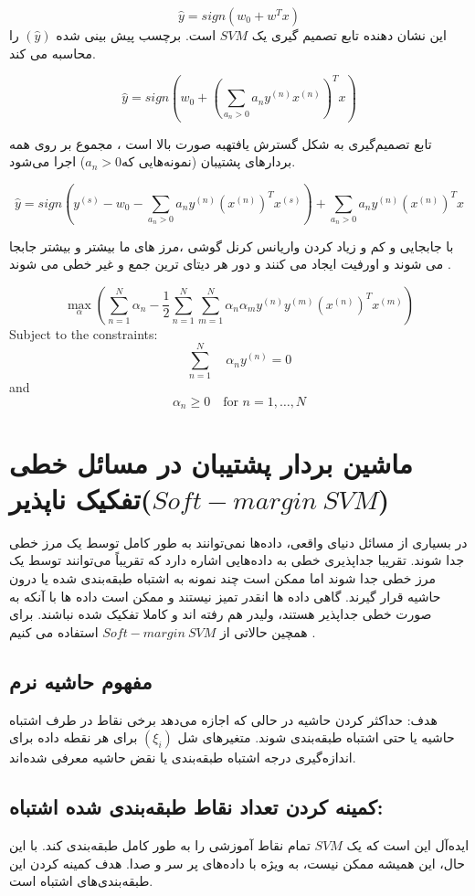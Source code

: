 \documentclass[12pt]{article}
\begin{document}
$$ \hat{y} = sign(w_0 + w^T x) $$
این نشان دهنده تابع تصمیم گیری یک 
$SVM$
است. برچسب پیش بینی شده 
$(\hat{y})$
را محاسبه می کند.

$$ \hat{y} = sign\left(w_0 + \left(\sum_{a_n > 0} a_n y^{(n)} x^{(n)}\right)^T x\right) $$


تابع تصمیم‌گیری به شکل گسترش یافتهبه صورت بالا است ،  مجموع بر روی همه بردارهای پشتیبان (نمونه‌هایی که$a_n > 0$) اجرا می‌شود.


$$ \hat{y} = sign\left(y^{(s)} - w_0 -\sum_{a_n > 0} a_n y^{(n)} (x^{(n)})^T x^{(s)}\right) +\sum_{a_n > 0} a_n y^{(n)} (x^{(n)})^T x $$



با جابجایی و کم و زیاد کردن واریانس کرنل گوشی ،مرز های ما بیشتر و بیشتر جابجا می شوند و اورفیت ایجاد می کنند  و دور هر دیتای ترین جمع و غیر خطی می شوند .

\begin{latin}
    $$
\max_{\alpha} \left( \sum_{n=1}^{N} \alpha_n - \frac{1}{2} \sum_{n=1}^{N} \sum_{m=1}^{N} \alpha_n \alpha_m y^{(n)} y^{(m)} \left( x^{(n)} \right)^T x^{(m)} \right)
$$
Subject to the constraints:
$$
\sum_{n=1}^{N} \quad \alpha_n y^{(n)} = 0
$$
and
$$
\alpha_n \geq 0 \quad \text{for } n = 1, \ldots, N
$$
\end{latin}

\section{ماشین بردار پشتیبان در مسائل خطی تفکیک ناپذیر($Soft-margin\:SVM$)
}
در بسیاری از مسائل دنیای واقعی، داده‌ها نمی‌توانند به طور کامل توسط یک مرز خطی جدا شوند. تقریبا جداپذیری خطی به داده‌هایی اشاره دارد که تقریباً می‌توانند توسط یک مرز خطی جدا شوند اما ممکن است چند نمونه به اشتباه طبقه‌بندی شده یا درون حاشیه قرار گیرند.
گاهی داده ها انقدر تمیز نیستند و ممکن است داده ها با آنکه به صورت خطی جداپذیر هستند، ولیدر هم رفته اند و کاملا تفکیک شده نباشند.
برای همچین حالاتی از
$Soft-margin\:SVM$
استفاده می کنیم .
\subsection{مفهوم حاشیه نرم}
هدف: حداکثر کردن حاشیه در حالی که اجازه می‌دهد برخی نقاط در طرف اشتباه حاشیه یا حتی اشتباه طبقه‌بندی شوند. متغیرهای شل \((\xi_i)\) برای هر نقطه داده برای اندازه‌گیری درجه اشتباه طبقه‌بندی یا نقض حاشیه معرفی شده‌اند.
\subsection{
کمینه کردن تعداد نقاط طبقه‌بندی شده اشتباه: }
ایده‌آل این است که یک $SVM$ تمام نقاط آموزشی را به طور کامل طبقه‌بندی کند. با این حال، این همیشه ممکن نیست، به ویژه با داده‌های پر سر و صدا. هدف کمینه کردن این طبقه‌بندی‌های اشتباه است.
\end{document}

